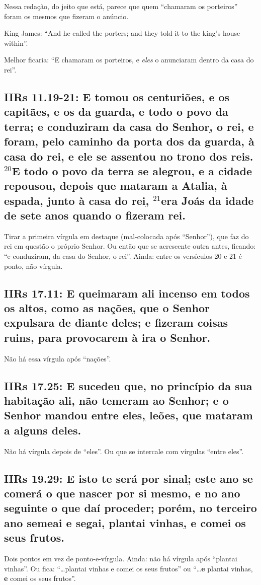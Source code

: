 Nessa redação, do jeito que está, parece que quem ``chamaram os
porteiros'' foram os mesmos que fizeram o anúncio.

King James: ``And he called the porters; and they told it to the
king's house within''.

Melhor ficaria: ``E chamaram os porteiros, e \emph{eles} o anunciaram dentro da casa do rei''.

\subsection{IIRs 11.19-21: E tomou os centuriões, e os capitães, e os da guarda, e todo o povo da terra; e conduziram da casa do Senhor\uline{,} o rei, e foram, pelo caminho da porta dos da guarda, à casa do rei, e ele se assentou no trono dos reis. $^{\mathrm{20}}$E todo o povo da terra se alegrou, e a cidade repousou, depois que mataram a Atalia, à espada, junto à casa do rei\uline{,} $^{\mathrm{21}}$era Joás da idade de sete anos quando o fizeram rei.}

Tirar a primeira vírgula em destaque (mal-colocada após ``Senhor''),
que faz do rei em questão o próprio Senhor. Ou então que se acrescente
outra antes, ficando: ``e conduziram, da casa do Senhor, o
rei''. Ainda: entre os versículos 20 e 21 é ponto, não vírgula.

\subsection{IIRs 17.11: E queimaram ali incenso em todos os altos, como as nações\uline{,} que o Senhor expulsara de diante deles; e fizeram coisas ruins, para provocarem à ira o Senhor.}
Não há essa vírgula após ``nações''.

\subsection{IIRs 17.25: E sucedeu que, no princípio da sua habitação ali, não temeram ao Senhor; e o Senhor mandou entre eles\uline{,} leões, que mataram a alguns deles.}
Não há vírgula depois de ``eles''. Ou que se intercale com vírgulas
``entre eles''.

\subsection{IIRs 19.29: E isto te será por sinal\uline{;} este ano se comerá o que nascer por si mesmo, e no ano seguinte o que daí proceder; porém, no terceiro ano semeai e segai, plantai vinhas\uline{,} e comei os seus frutos.}
Dois pontos em vez de ponto-e-vírgula. Ainda: não há vírgula após
``plantai vinhas''. Ou fica: ``\ldots plantai vinhas e comei os seus
frutos'' ou ``\ldots \textbf{e} plantai vinhas, \textbf{e} comei os
seus frutos''.

